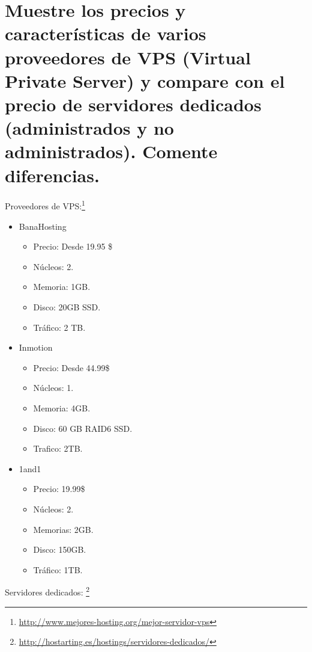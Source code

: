 \section{Muestre los precios y características de varios proveedores de VPS (Virtual Private Server) y compare con el precio de servidores dedicados (administrados y no administrados). Comente diferencias.}
Proveedores de VPS:\footnote{\url{http://www.mejores-hosting.org/mejor-servidor-vps}}
\begin{itemize}
\item BanaHosting
	\begin{itemize}
	\item Precio: Desde 19.95 \$
	\item Núcleos: 2.
	\item Memoria: 1GB.
	\item Disco: 20GB SSD.
	\item Tráfico: 2 TB.
	\end{itemize}
\item Inmotion
	\begin{itemize}
	\item Precio: Desde 44.99\$
	\item Núcleos: 1.
	\item Memoria: 4GB.
	\item Disco: 60 GB RAID6 SSD.
	\item Trafico: 2TB.
	\end{itemize}
\item 1and1
	\begin{itemize}
	\item Precio: 19.99\$
	\item Núcleos: 2.
	\item Memorias: 2GB.
	\item Disco: 150GB.
	\item Tráfico: 1TB.
	\end{itemize}
\end{itemize}
Servidores dedicados: \footnote{\url{http://hostarting.es/hostings/servidores-dedicados/}}
